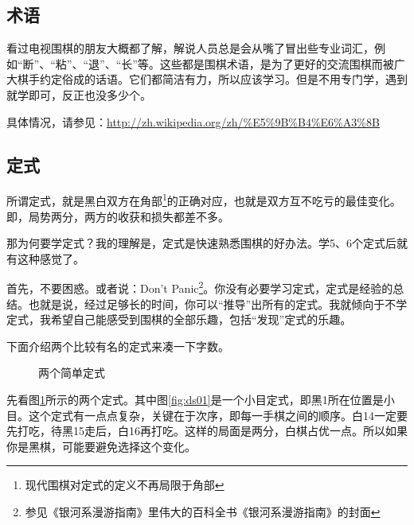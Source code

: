 \documentclass[12pt，a4paper, titlepage]{article}
\begin{document}
\subsection{术语}
看过电视围棋的朋友大概都了解，解说人员总是会从嘴了冒出些专业词汇，例如“断”、“粘”、“退”、“长”等。这些都是围棋术语，是为了更好的交流围棋而被广大棋手约定俗成的话语。它们都简洁有力，所以应该学习。但是不用专门学，遇到就学即可，反正也没多少个。

具体情况，请参见：\url{http://zh.wikipedia.org/zh/\%E5\%9B\%B4\%E6\%A3\%8B}

\subsection{定式}
所谓定式，就是黑白双方在角部\footnote{现代围棋对定式的定义不再局限于角部}的正确对应，也就是双方互不吃亏的最佳变化。即，局势两分，两方的收获和损失都差不多。

那为何要学定式？我的理解是，定式是快速熟悉围棋的好办法。学5、6个定式后就有这种感觉了。

首先，不要困惑。或者说：Don't Panic\footnote{参见《银河系漫游指南》里伟大的百科全书《银河系漫游指南》的封面}。你没有必要学习定式，定式是经验的总结。也就是说，经过足够长的时间，你可以“推导”出所有的定式。我就倾向于不学定式，我希望自己能感受到围棋的全部乐趣，包括“发现”定式的乐趣。

下面介绍两个比较有名的定式来凑一下字数。


\begin{figure}[htbp]   %
	\setlength{\abovecaptionskip}{4pt}    
	\setlength{\belowcaptionskip}{4pt}
	\centering  %
	\hspace{15pt}
	\caption{两个简单定式}
	\label{fig:dingshi}
\end{figure}
先看图\ref{fig:dingshi}所示的两个定式。其中图\ref{fig:ds01}是一个小目定式，即黑1所在位置是小目。这个定式有一点点复杂，关键在于次序，即每一手棋之间的顺序。白14一定要先打吃，待黑15走后，白16再打吃。这样的局面是两分，白棋占优一点。所以如果你是黑棋，可能要避免选择这个变化。
\end{document}

